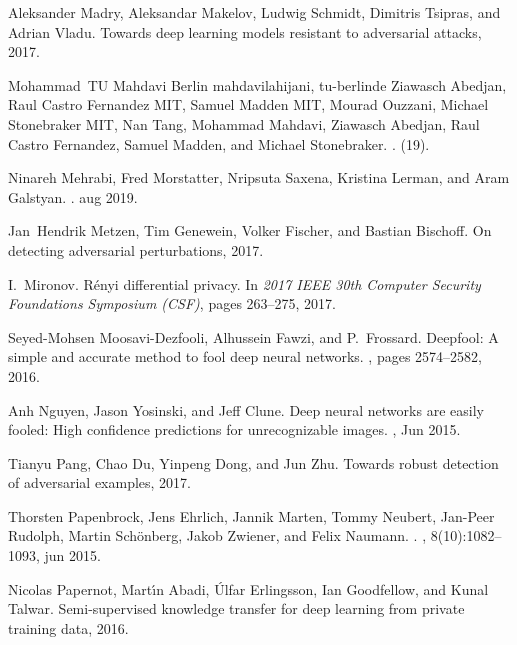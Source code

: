 \documentclass[11pt]{article}
\begin{document}
\begin{thebibliography}{10}
Aleksander Madry, Aleksandar Makelov, Ludwig Schmidt, Dimitris Tsipras, and
  Adrian Vladu.
\newblock Towards deep learning models resistant to adversarial attacks, 2017.

Mohammad~TU {Mahdavi Berlin mahdavilahijani}, tu-berlinde {Ziawasch Abedjan},
  Raul {Castro Fernandez MIT}, Samuel {Madden MIT}, Mourad Ouzzani, Michael
  {Stonebraker MIT}, Nan Tang, Mohammad Mahdavi, Ziawasch Abedjan, Raul {Castro
  Fernandez}, Samuel Madden, and Michael Stonebraker.
.
(19).

Ninareh Mehrabi, Fred Morstatter, Nripsuta Saxena, Kristina Lerman, and Aram
  Galstyan.
.
\newblock aug 2019.

Jan~Hendrik Metzen, Tim Genewein, Volker Fischer, and Bastian Bischoff.
\newblock On detecting adversarial perturbations, 2017.

I.~{Mironov}.
\newblock R{\'e}nyi differential privacy.
\newblock In {\em 2017 IEEE 30th Computer Security Foundations Symposium
  (CSF)}, pages 263--275, 2017.

Seyed-Mohsen Moosavi-Dezfooli, Alhussein Fawzi, and P.~Frossard.
\newblock Deepfool: A simple and accurate method to fool deep neural networks.
, pages 2574--2582, 2016.

Anh Nguyen, Jason Yosinski, and Jeff Clune.
\newblock Deep neural networks are easily fooled: High confidence predictions
  for unrecognizable images.
, Jun 2015.

Tianyu Pang, Chao Du, Yinpeng Dong, and Jun Zhu.
\newblock Towards robust detection of adversarial examples, 2017.

Thorsten Papenbrock, Jens Ehrlich, Jannik Marten, Tommy Neubert, Jan-Peer
  Rudolph, Martin Sch{\"{o}}nberg, Jakob Zwiener, and Felix Naumann.
.
, 8(10):1082--1093, jun 2015.

Nicolas Papernot, Mart{\'\i}n Abadi, {\'U}lfar Erlingsson, Ian Goodfellow, and
  Kunal Talwar.
\newblock Semi-supervised knowledge transfer for deep learning from private
  training data, 2016.


\end{thebibliography}
\end{document}
